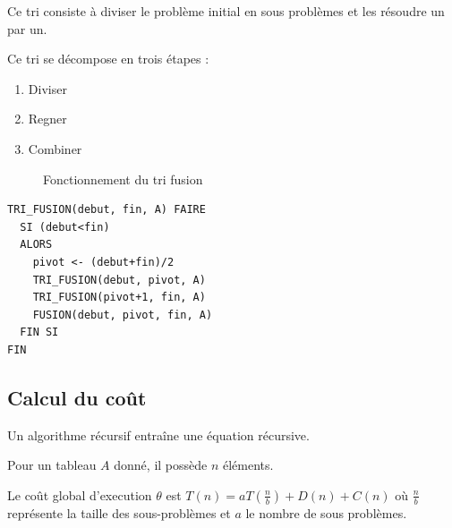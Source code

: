 Ce tri consiste à diviser le problème initial en sous problèmes et les
résoudre un par un.

Ce tri se décompose en trois étapes :
\begin{enumerate}
  \item Diviser
  \item Regner
  \item Combiner
\end{enumerate}

\begin{figure}[h]
\centering
{}
\caption{Fonctionnement du tri fusion}
\end{figure}

\begin{lstlisting}
TRI_FUSION(debut, fin, A) FAIRE
  SI (debut<fin)
  ALORS
    pivot <- (debut+fin)/2
    TRI_FUSION(debut, pivot, A)
    TRI_FUSION(pivot+1, fin, A)
    FUSION(debut, pivot, fin, A)
  FIN SI
FIN
\end{lstlisting}

\subsection{Calcul du coût}
Un algorithme récursif entraîne une équation récursive. 

Pour un tableau $A$ donné, il possède $n$ éléments.

Le coût global d'execution $\theta$ est 
$T(n) = aT(\frac{n}{b}) + D(n) + C(n)$ où $\frac{n}{b}$ représente la taille
des sous-problèmes et $a$ le nombre de sous problèmes.

